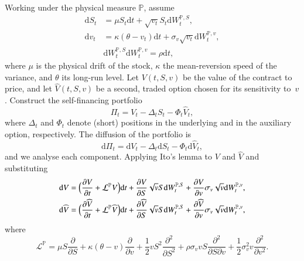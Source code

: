 \documentclass[12pt]{report} %
\theoremstyle{plain} %
\theoremstyle{definition} %
\theoremstyle{remark} %
\begin{document}
Working under the physical measure $\mathbb P$, assume
\begin{equation}\label{eq:heston_phys}
\begin{aligned}
\mathrm dS_t &= \mu S_t \mathrm dt + \sqrt{v_t}S_t\mathrm dW_t^{\mathbb P,S},\\
\mathrm dv_t &= \kappa(\theta - v_t)\mathrm dt + \sigma_v\sqrt{v_t}\mathrm dW_t^{\mathbb P,v},\\
&\mathrm dW_t^{\mathbb P,S}\mathrm dW_t^{\mathbb P,v} = \rho\mathrm dt,
\end{aligned}
\end{equation}
where $\mu$ is the physical drift of the stock, $\kappa$ the mean-reversion speed of the
variance, and $\theta$ its long-run level. Let $V(t,S,v)$ be the value of the contract to price,
and let $\widehat V(t,S,v)$ be a second, traded option chosen for its sensitivity to~$v$.
Construct the self-financing portfolio
\begin{equation}\label{eq:heston_portfolio}
\Pi_t = V_t - \Delta_t S_t - \Phi_t \widehat V_t ,
\end{equation}
where $\Delta_t$ and $\Phi_t$ denote (short) positions in the underlying and in the auxiliary
option, respectively. The diffusion of the portfolio is
\begin{equation}\label{eq:heston_portfolio_diffusion}
\mathrm d\Pi_t = \mathrm dV_t - \Delta_t \mathrm dS_t - \Phi_t \mathrm d\widehat V_t,
\end{equation}
and we analyse each component. Applying Ito's lemma to $V$ and $\widehat V$ and substituting
\begin{equation}\label{eq:heston_dVs}
\begin{aligned}
\mathrm dV &= \Bigl(\frac{\partial V}{\partial t} + \mathcal L^{\mathbb P}V\Bigr)\mathrm dt
 + \frac{\partial V}{\partial S}\sqrt{v}S\mathrm dW_t^{\mathbb P,S}
 + \frac{\partial V}{\partial v}\sigma_v\sqrt{v}\mathrm dW_t^{\mathbb P,v},\\
\mathrm d\widehat V &= \Bigl(\frac{\partial \widehat V}{\partial t} + \mathcal L^{\mathbb P}\widehat V\Bigr)\mathrm dt
 + \frac{\partial \widehat V}{\partial S}\sqrt{v}S\mathrm dW_t^{\mathbb P,S}
 + \frac{\partial \widehat V}{\partial v}\sigma_v\sqrt{v}\mathrm dW_t^{\mathbb P,v},
\end{aligned}
\end{equation}
where
\[
\mathcal L^{\mathbb P}
 = \mu S\frac{\partial}{\partial S}
 + \kappa(\theta - v)\frac{\partial}{\partial v}
 + \frac{1}{2} v S^{2}\frac{\partial^{2}}{\partial S^{2}}
 + \rho\sigma_v v S\frac{\partial^{2}}{\partial S\partial v}
 + \frac{1}{2}\sigma_v^{2} v \frac{\partial^{2}}{\partial v^{2}}.
\]
\end{document}
